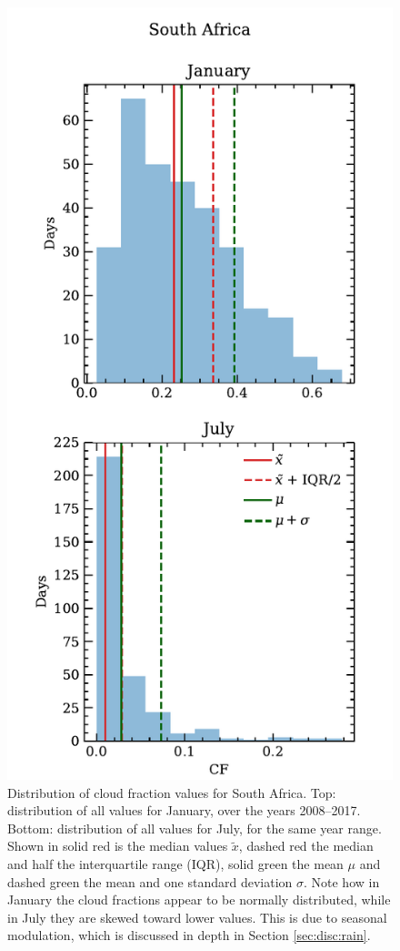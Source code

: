 \begin{figure}
  \centering
  \includegraphics[width=0.8\linewidth]{figures/cf_monthly_dist_capetown}
  \caption{Distribution of cloud fraction values for South
    Africa. Top: distribution of all values for January, over the
    years 2008--2017. Bottom: distribution of all values for July, for
    the same year range. Shown in solid red is the median values
    $\tilde{x}$, dashed red the median and half the interquartile
    range (IQR), solid green the mean $\mu$ and dashed green the mean
    and one standard deviation $\sigma$. Note how in January the cloud
    fractions appear to be normally distributed, while in July they
    are skewed toward lower values. This is due to seasonal
    modulation, which is discussed in depth in Section
    \ref{sec:disc:rain}.}
  \label{fig:cf_dist_south}
\end{figure}
